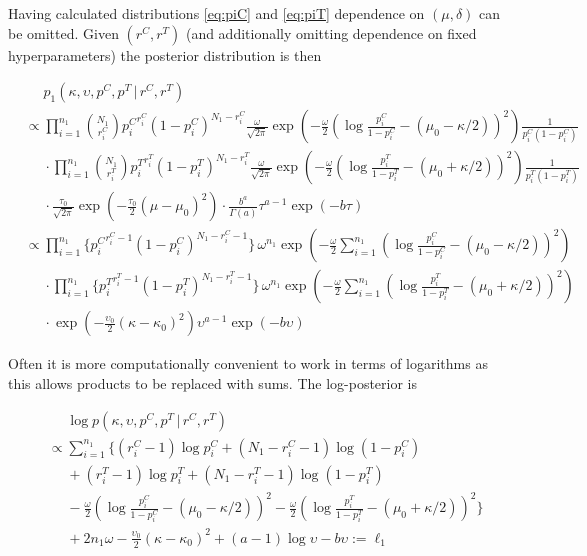 \documentclass[11pt,]{book}
\begin{document}
Having calculated distributions \eqref{eq:piC} and \eqref{eq:piT}
dependence on \((\mu, \delta)\) can be omitted. Given \((r^C, r^T)\)
(and additionally omitting dependence on fixed hyperparameters) the
posterior distribution is then

\begin{align}
&\phantom{\propto} p_1(\kappa, \upsilon, p^C, p^T \, | \, r^C, r^T) \nonumber \\
&\propto \prod_{i=1}^{n_1} {N_1\choose r_i^C} {p_i^C}^{r_i^C} (1 - p_i^C)^{N_1 - r_i^C} \frac{\omega}{\sqrt{2\pi}} \exp\left(-\frac{\omega}{2}\left(\log \frac{p_i^C}{1 - p_i^C} - (\mu_0 - \kappa/2)\right)^2\right) \frac{1}{p_i^C(1-p_i^C)} \nonumber \\
&\phantom{\propto} \cdot \prod_{i=1}^{n_1} {N_1\choose r_i^T} {p_i^T}^{r_i^T} (1 - p_i^T)^{N_1 - r_i^T}
\frac{\omega}{\sqrt{2\pi}} \exp\left(-\frac{\omega}{2}\left(\log \frac{p_i^T}{1 - p_i^T} - (\mu_0 + \kappa/2)\right)^2\right) \frac{1}{p_i^T(1-p_i^T)} \nonumber \\
&\phantom{\propto} \cdot \frac{\tau_0}{\sqrt{2\pi}} \exp\left(-\frac{\tau_0}{2}(\mu - \mu_0)^2\right) \cdot \frac{b^a}{\Gamma(a)} \tau^{a-1} \exp(-b \tau) \nonumber \\
&\propto \prod_{i=1}^{n_1} \{ {p_i^C}^{r_i^C - 1} (1 - p_i^C)^{N_1 - r_i^C - 1} \} \, \omega^{n_1} \exp\left(-\frac{\omega}{2} \sum_{i=1}^{n_1} \left(\log \frac{p_i^C}{1 - p_i^C} - (\mu_0 - \kappa/2)\right)^2\right) \nonumber \\
&\phantom{\propto} \cdot \prod_{i=1}^{n_1} \{ {p_i^T}^{r_i^T - 1} (1 - p_i^T)^{N_1 - r_i^T - 1} \} \, \omega^{n_1} \exp\left(-\frac{\omega}{2} \sum_{i=1}^{n_1} \left(\log \frac{p_i^T}{1 - p_i^T} - (\mu_0 + \kappa/2)\right)^2\right) \nonumber \\
&\phantom{\propto} \cdot \exp\left(-\frac{\upsilon_0}{2}(\kappa - \kappa_0)^2\right) \upsilon^{a-1} \exp(-b \upsilon) \label{eq:ex2post}
\end{align}

Often it is more computationally convenient to work in terms of
logarithms as this allows products to be replaced with sums. The
log-posterior is

\begin{align}
&\phantom{\propto} \log p(\kappa, \upsilon, p^C, p^T \, | \, r^C, r^T) \nonumber \\
&\propto \sum_{i = 1}^{n_1} \{ (r_i^C - 1) \log p_i^C + (N_1 - r_i^C - 1) \log (1 - p_i^C) \nonumber \\
&\phantom{\propto} + (r_i^T - 1) \log p_i^T + (N_1 - r_i^T - 1) \log (1 - p_i^T) \nonumber \\
&\phantom{\propto} - \frac{\omega}{2} \left(\log \frac{p_i^C}{1 - p_i^C} - (\mu_0 - \kappa/2)\right)^2 - \frac{\omega}{2} \left(\log \frac{p_i^T}{1 - p_i^T} - (\mu_0 + \kappa/2)\right)^2 \} \nonumber \\
&\phantom{\propto} + 2n_1 \omega - \frac{\upsilon_0}{2}(\kappa - \kappa_0)^2 + (a - 1)\log \upsilon - b \upsilon := \ell_1
\end{align}
\end{document}
